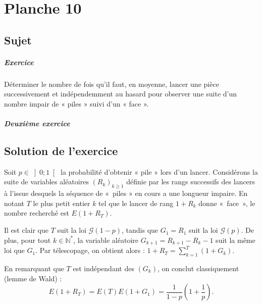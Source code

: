 \chapter{Planche 10}

\section{Sujet}
\paragraph{Exercice}
Déterminer le nombre de fois qu'il faut, en moyenne, lancer une pièce
successivement et indépendemment au hasard pour observer une suite d'un
nombre impair de « piles » suivi d'un « face ».

\paragraph{Deuxième exercice}

\section{Solution de l'exercice}

Soit $p \in \left]0;1\right[$ la probabilité d'obtenir « pile » lors d'un lancer.
Considérons la suite de variables aléatoires $(R_k)_{k \geq 1}$ définie par
les rangs successifs des lancers à l'issue desquels la séquence de « piles » en
cours a une longueur impaire. En notant $T$ le plus petit entier $k$ tel que le lancer de rang $1 + R_k$ donne « face », le nombre recherché est $E(1 + R_T)$.

Il est clair que $T$ suit la loi $\mathcal G(1-p)$, tandis que $G_1 = R_1$ suit la loi $\mathcal G(p)$.
De plus, pour tout $k \in \mathbb N^*$, la variable aléatoire $G_{k+1} = R_{k+1} - R_k - 1$ suit la même loi que $G_1$.
Par télescopage, on obtient alors :
$1 + R_T = \sum_{k=1}^{T} (1 + G_k).$

En remarquant que $T$ est indépendant des $(G_k)$, on conclut classiquement (lemme de Wald) :
$$
E(1 + R_T) =
E(T)E(1 + G_1) = \frac1{1-p}\left(1+\frac1p\right).
$$
